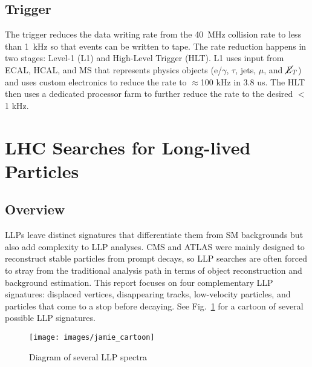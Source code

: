 \documentclass[12pt]{article}
\begin{document}
    \subsection{Trigger}
        The trigger reduces the data writing rate from the \SI{40}{\mega\hertz} collision rate to less than \SI{1}{\kilo\hertz} so that events can be written to tape. The rate reduction happens in two stages: Level-1 (L1) and High-Level Trigger (HLT). L1 uses input from ECAL, HCAL, and MS that represents physics objects ($\mathrm{e}$/$\gamma$, $\tau$, jets, $\mu$, and $\cancel{\it{E}}_{T}$) and uses custom electronics to reduce the rate to $\approx$100 kHz in 3.8 us. The HLT then uses a dedicated processor farm to further reduce the rate to the desired $<$ 1 kHz.

\section{LHC Searches for Long-lived Particles}
    \subsection{Overview}
        LLPs leave distinct signatures that differentiate them from SM backgrounds but also add complexity to LLP analyses. CMS and ATLAS were mainly designed to reconstruct stable particles from prompt decays, so LLP searches are often forced to stray from the traditional analysis path in terms of object reconstruction and background estimation. This report focuses on four complementary LLP signatures: displaced vertices, disappearing tracks, low-velocity particles, and particles that come to a stop before decaying. See Fig.~\ref{jamie_cartoon} for a cartoon of several possible LLP signatures.

        \noindent \begin{figure}[htbp] \begin{center}
        \texttt{[image: images/jamie\_cartoon]}
            \caption{Diagram of several LLP spectra}
        \label{jamie_cartoon}
        \end{center} \end{figure}
\end{document}
